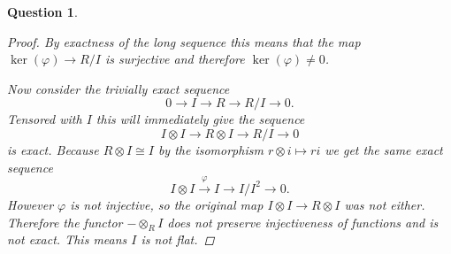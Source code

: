 \documentclass{article}
\newtheorem{question}{Question}
\theoremstyle{definition}
\begin{document}
\begin{question}
\begin{enumerate}[(a)]
\begin{proof}
                  By exactness of the long sequence this means that the map
                  \(\ker(\varphi)\to R/I\) is surjective and therefore
                  \(\ker(\varphi)\neq 0\).

                  Now consider the trivially exact sequence
                  \[
                      0\to I\to R\to R/I\to 0.
                  \]
                  Tensored with \(I\) this will immediately give the sequence
                  \[
                      I\otimes I\to R\otimes I\to R/I\to 0
                  \]
                  is exact. Because \(R\otimes I\cong I\) by the isomorphism
                  \(r\otimes i\mapsto ri\) we get the same exact sequence
                  \[
                      I\otimes I\overset{\varphi}{\to} I\to I/I^{2}\to 0.
                  \]
                  However \(\varphi\) is not injective, so the original map
                  \(I\otimes I\to R\otimes I\) was not either. Therefore the
                  functor \(-\otimes_{R}I\) does not preserve injectiveness of
                  functions and is not exact. This means \(I\) is not flat.
              \end{proof}
    \end{enumerate}
\end{question}
\end{document}
